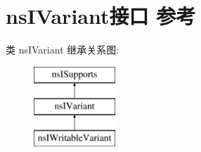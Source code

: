 \hypertarget{interfacens_i_variant}{}\section{ns\+I\+Variant接口 参考}
\label{interfacens_i_variant}
类 ns\+I\+Variant 继承关系图\+:\begin{figure}[H]
\begin{center}
\leavevmode
\includegraphics[height=3.000000cm]{interfacens_i_variant}
\end{center}
\end{figure}
